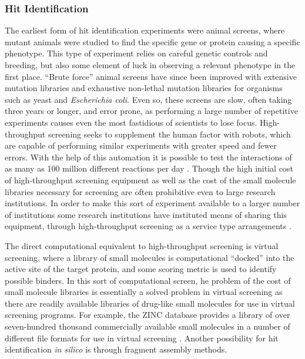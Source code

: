 \subsubsection{Hit Identification}
\label{subsubsection:hit_identification}
The earliest form of hit identification experiments were animal screens, where mutant animals were studied to find the specific gene or protein causing a specific phenotype.
This type of experiment relies on careful genetic controls and breeding, but also some element of luck in observing a relevant phenotype in the first place.
``Brute force'' animal screens have since been improved with extensive mutation libraries and exhaustive non-lethal mutation libraries for organisms such as yeast and {\it Escherichia coli}.
Even so, these screens are slow, often taking three years or longer, and error prone, as performing a large number of repetitive experiments causes even the most fastidious of scientists to lose focus.
High-throughput screening seeks to supplement the human factor with robots, which are capable of performing similar experiments with greater speed and fewer errors.
With the help of this automation it is possible to test the interactions of as many as 100 million different reactions per day \cite{agresti2010ultrahigh}.
Though the high initial cost of high-throughput screening equipment as well as the cost of the small molecule libraries necessary for screening are often prohibitive even to large research institutions.
In order to make this sort of experiment available to a larger number of institutions some research institutions have instituted means of sharing this equipment, through high-throughput screening as a service type arrangements \cite{htsrc,mssr}.

The direct computational equivalent to high-throughput screening is virtual screening, where a library of small molecules is computational ``docked'' into the active site of the target protein, and some scoring metric is used to identify possible binders.
In this sort of computational screen, he problem of the cost of small molecule libraries is essentially a solved problem in virtual screening as there are readily available libraries of drug-like small molecules for use in virtual screening programs.
For example, the ZINC database provides a library of over seven-hundred thousand commercially available small molecules in a number of different file formats for use in virtual screening \cite{irwin2005zinc}.
Another possibility for hit identification {\it in silico} is through fragment assembly methods.

